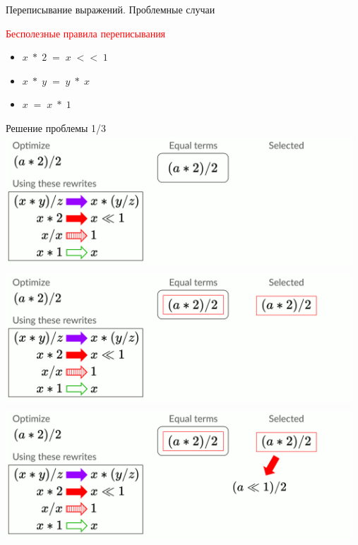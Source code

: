 \documentclass[aspectratio=169
  , xcolor={svgnames}
  , russian  %
  ]{beamer}
\begin{document}
\begin{frame}{Переписывание выражений. Проблемные случаи}
{    \vspace{1cm} %

    {\fontsize{15.1}{12}\selectfont \textcolor{red}{Бесполезные правила переписывания}}
    {\fontsize{16.1}{12}\selectfont %
    \begin{itemize}
    \item $x\; * \;2 \; = \;  x \; << \; 1$
    \item $x \;*\; y \;= \;y \;* \;x$
    \item $x \;= \;x \;* \;1$
    \end{itemize}
    }
}
\end{frame}

\begin{frame}{Решение проблемы 1/3}
    {
        \centering
        \includegraphics[width=13cm, height=5cm]{misc/egraphs_images/naive/n-0.jpg}
   }
    {
        \centering
        \includegraphics[width=13cm, height=5cm]{misc/egraphs_images//naive/n-1.jpg}
   }
    {
        \centering
        \includegraphics[width=13cm, height=5cm]{misc/egraphs_images/naive/n-2.jpg}
}
\end{frame}
\end{document}
